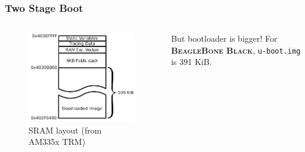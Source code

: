 \documentclass[aspectratio=169]{beamer}
\begin{document}
\begin{frame}
  \frametitle{Two Stage Boot}
  \begin{columns}
      \begin{figure}
        \centering
        \includegraphics[scale=1]{images/sram.pdf}
        \caption{SRAM layout (from AM335x TRM)}
      \end{figure}
    \pause
      \begin{alertblock}{But bootloader is bigger!}
      For \textbf{\textsc{BeagleBone Black}}, \texttt{u-boot.img} is 391 KiB.
      \end{alertblock}
  \end{columns}
\end{frame}
\end{document}

